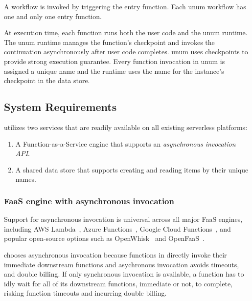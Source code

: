 A workflow is invoked by triggering the entry function. Each unum workflow has
one and only one entry function.

At execution time, each function runs both the user code and the unum runtime.
The unum runtime manages the function's checkpoint and invokes the
continuation asynchronously after user code completes. unum uses checkpoints
to provide strong execution guarantee. Every function invocation in unum is
assigned a unique name and the runtime uses the name for the instance's
checkpoint in the data store.

\subsection{System Requirements}

\name{} utilizes two services that are readily available on all existing
serverless platforms:

\begin{enumerate}

	\item A Function-as-a-Service engine that supports an
	\emph{asynchronous invocation API}.

	\item A shared data store that supports creating and reading items by
	 their unique names.

\end{enumerate}

\subsubsection{FaaS engine with asynchronous invocation}

Support for asynchronous invocation is universal across all major FaaS
engines, including AWS Lambda~\cite{aws-lambda-async-invoke}, Azure
Functions~\cite{azure-functions-async-invoke}, Google Cloud
Functions~\cite{google-cloud-functions-async-invoke}, and popular open-source
options such as OpenWhisk~\cite{openwhisk-async-invoke} and
OpenFaaS~\cite{openfaas-async-invoke}.

\name{} chooses asynchronous invocation because functions in \name{} directly invoke
their immediate downstream functions and asychronous invocation avoids
timeouts, and double billing. If only synchronous invocation is available, a
function has to idly wait for all of its downstream functions, immediate or
not, to complete, risking function timeouts and incurring double billing.

